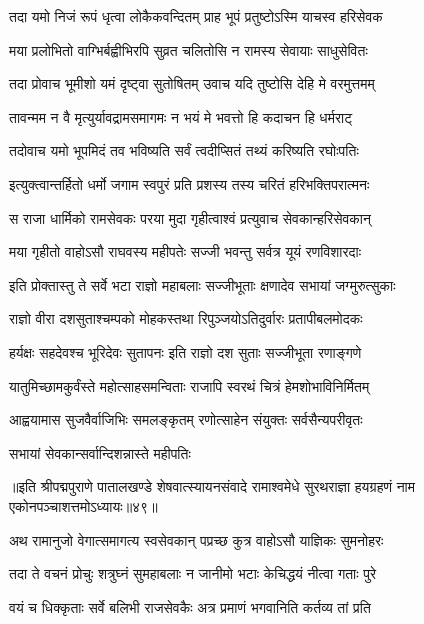 \twolineshloka
{तदा यमो निजं रूपं धृत्वा लोकैकवन्दितम्}
{प्राह भूपं प्रतुष्टोऽस्मि याचस्व हरिसेवक}%

\twolineshloka
{मया प्रलोभितो वाग्भिर्बह्वीभिरपि सुव्रत}
{चलितोसि न रामस्य सेवायाः साधुसेवितः}%

\twolineshloka
{तदा प्रोवाच भूमीशो यमं दृष्ट्वा सुतोषितम्}
{उवाच यदि तुष्टोसि देहि मे वरमुत्तमम्}%

\twolineshloka
{तावन्मम न वै मृत्युर्यावद्रामसमागमः}
{न भयं मे भवत्तो हि कदाचन हि धर्मराट्}%

\twolineshloka
{तदोवाच यमो भूपमिदं तव भविष्यति}
{सर्वं त्वदीप्सितं तथ्यं करिष्यति रघोःपतिः}%

\twolineshloka
{इत्युक्त्वान्तर्हितो धर्मो जगाम स्वपुरं प्रति}
{प्रशस्य तस्य चरितं हरिभक्तिपरात्मनः}%

\twolineshloka
{स राजा धार्मिको रामसेवकः परया मुदा}
{गृहीत्वाश्वं प्रत्युवाच सेवकान्हरिसेवकान्}%

\twolineshloka
{मया गृहीतो वाहोऽसौ राघवस्य महीपतेः}
{सज्जी भवन्तु सर्वत्र यूयं रणविशारदाः}%

\twolineshloka
{इति प्रोक्तास्तु ते सर्वे भटा राज्ञो महाबलाः}
{सज्जीभूताः क्षणादेव सभायां जग्मुरुत्सुकाः}%

\twolineshloka
{राज्ञो वीरा दशसुताश्चम्पको मोहकस्तथा}
{रिपुञ्जयोऽतिदुर्वारः प्रतापीबलमोदकः}%

\twolineshloka
{हर्यक्षः सहदेवश्च भूरिदेवः सुतापनः}
{इति राज्ञो दश सुताः सज्जीभूता रणाङ्गणे}%

\twolineshloka
{यातुमिच्छामकुर्वंस्ते महोत्साहसमन्विताः}
{राजापि स्वरथं चित्रं हेमशोभाविनिर्मितम्}%

\twolineshloka
{आह्वयामास सुजवैर्वाजिभिः समलङ्कृतम्}
{रणोत्साहेन संयुक्तः सर्वसैन्यपरीवृतः}%

\onelineshloka
{सभायां सेवकान्सर्वान्दिशन्नास्ते महीपतिः}%

{॥इति श्रीपद्मपुराणे पातालखण्डे शेषवात्स्यायनसंवादे रामाश्वमेधे सुरथराज्ञा हयग्रहणं नाम एकोनपञ्चाशत्तमोऽध्यायः॥४९॥}



\twolineshloka
{अथ रामानुजो वेगात्समागत्य स्वसेवकान्}
{पप्रच्छ कुत्र वाहोऽसौ याज्ञिकः सुमनोहरः}%

\twolineshloka
{तदा ते वचनं प्रोचुः शत्रुघ्नं सुमहाबलाः}
{न जानीमो भटाः केचिद्धयं नीत्वा गताः पुरे}%

\twolineshloka
{वयं च धिक्कृताः सर्वे बलिभी राजसेवकैः}
{अत्र प्रमाणं भगवानिति कर्तव्य तां प्रति}%

